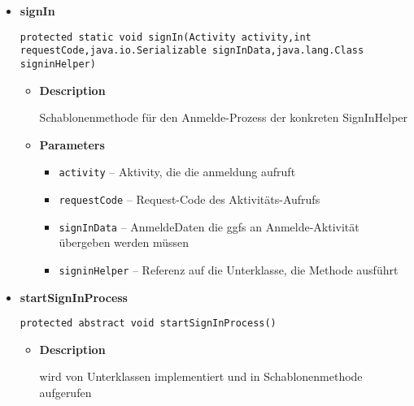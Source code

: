 \documentclass[11pt,a4paper]{report}
\begin{document}
{{{{{{{{{{{\begin{itemize}
{\begin{itemize}
{gibt das Ergebnis der Anmelde-Aktivität an das aufrufende Objekt zurück
}
\item{
{\bf  Parameters}
  \begin{itemize}
   \item{
\texttt{accountData} -- Ergebnis der Anmelde-Aktivität}
  \end{itemize}
}%
\end{itemize}
}%
\item{ 
\hypertarget{edu.kit.pse17.go_app.Login.SignInHelper.signIn(Activity, int, java.io.Serializable, java.lang.Class)}{{\bf  signIn}\\}
\begin{lstlisting}[frame=none]
protected static void signIn(Activity activity,int requestCode,java.io.Serializable signInData,java.lang.Class signinHelper)\end{lstlisting} %
\begin{itemize}
\item{
{\bf  Description}

Schablonenmethode für den Anmelde-Prozess der konkreten SignInHelper
}
\item{
{\bf  Parameters}
  \begin{itemize}
   \item{
\texttt{activity} -- Aktivity, die die anmeldung aufruft}
   \item{
\texttt{requestCode} -- Request-Code des Aktivitäts-Aufrufs}
   \item{
\texttt{signInData} -- AnmeldeDaten die ggfs an Anmelde-Aktivität übergeben werden müssen}
   \item{
\texttt{signinHelper} -- Referenz auf die Unterklasse, die Methode ausführt}
  \end{itemize}
}%
\end{itemize}
}%
\item{ 
\hypertarget{edu.kit.pse17.go_app.Login.SignInHelper.startSignInProcess()}{{\bf  startSignInProcess}\\}
\begin{lstlisting}[frame=none]
protected abstract void startSignInProcess()\end{lstlisting} %
\begin{itemize}
\item{
{\bf  Description}

wird von Unterklassen implementiert und in Schablonenmethode aufgerufen
}
\end{itemize}
}%
\end{itemize}
}
}
}
}}}}}}}}
\end{document}
